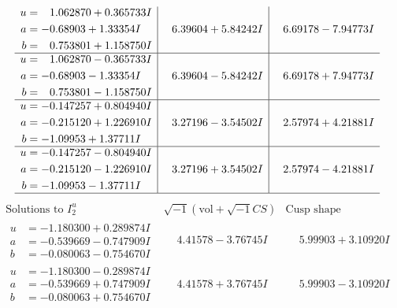 \documentclass[1p]{elsarticle_modified}
\theoremstyle{definition}
\newcommand{\I}{\sqrt{-1}}
\begin{document}
$$\begin{array}{c|c|c}
\begin{aligned}
u &= \phantom{-}1.062870 + 0.365733 I \\
a &= -0.68903 + 1.33354 I \\
b &= \phantom{-}0.753801 + 1.158750 I\end{aligned}
 & \phantom{-}6.39604 + 5.84242 I & \phantom{-}6.69178 - 7.94773 I \\ \hline\begin{aligned}
u &= \phantom{-}1.062870 - 0.365733 I \\
a &= -0.68903 - 1.33354 I \\
b &= \phantom{-}0.753801 - 1.158750 I\end{aligned}
 & \phantom{-}6.39604 - 5.84242 I & \phantom{-}6.69178 + 7.94773 I \\ \hline\begin{aligned}
u &= -0.147257 + 0.804940 I \\
a &= -0.215120 + 1.226910 I \\
b &= -1.09953 + 1.37711 I\end{aligned}
 & \phantom{-}3.27196 - 3.54502 I & \phantom{-}2.57974 + 4.21881 I \\ \hline\begin{aligned}
u &= -0.147257 - 0.804940 I \\
a &= -0.215120 - 1.226910 I \\
b &= -1.09953 - 1.37711 I\end{aligned}
 & \phantom{-}3.27196 + 3.54502 I & \phantom{-}2.57974 - 4.21881 I\\
 \hline 
 \end{array}$$\newpage$$\begin{array}{c|c|c}  
\text{Solutions to }I^u_{2}& \I (\text{vol} + \sqrt{-1}CS) & \text{Cusp shape}\\
 \hline 
\begin{aligned}
u &= -1.180300 + 0.289874 I \\
a &= -0.539669 - 0.747909 I \\
b &= -0.080063 - 0.754670 I\end{aligned}
 & \phantom{-}4.41578 - 3.76745 I & \phantom{-}5.99903 + 3.10920 I \\ \hline\begin{aligned}
u &= -1.180300 - 0.289874 I \\
a &= -0.539669 + 0.747909 I \\
b &= -0.080063 + 0.754670 I\end{aligned}
 & \phantom{-}4.41578 + 3.76745 I & \phantom{-}5.99903 - 3.10920 I \\ \hline\begin{aligned}

\end{aligned}
\end{array}$$
\end{document}
